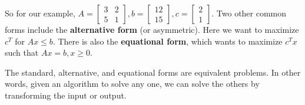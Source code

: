 So for our example, $A=\left[ 
\begin{smallmatrix}
    3 & 2 \\ 5 & 1
\end{smallmatrix}\right],b=\left[ 
\begin{smallmatrix}
    12 \\ 15
\end{smallmatrix}\right] ,c=\left[ 
\begin{smallmatrix}
    2 \\ 1
\end{smallmatrix}\right]$. Two other common forms include the \textbf{alternative form} (or asymmetric). Here we want to maximize $c^T$ for $Ax \leq b$. There is also the \textbf{equational form}, which wants to maximize $c^T x$ such that $Ax=b,x \geq 0$.
\begin{claim}
    The standard, alternative, and equational forms are equivalent problems. In other words, given an algorithm to solve any one,  we can solve the others by transforming the input or output.
\end{claim}
